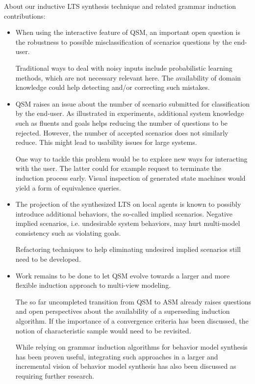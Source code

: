 About our inductive LTS synthesis technique and related grammar induction contributions:
\begin{itemize}

\item When using the interactive feature of QSM, an important open question is the robustness to possible misclassification of scenarios questions by the end-user. 

Traditional ways to deal with noisy inputs include probabilistic learning methods, which are not necessary relevant here. The availability of domain knowledge could help detecting and/or correcting such mistakes.

\item QSM raises an issue about the number of scenario submitted for classification by the end-user. As illustrated in experiments, additional system knowledge such as fluents and goals helps reducing the number of questions to be rejected. However, the number of accepted scenarios does not similarly reduce. This might lead to usability issues for large systems.

One way to tackle this problem would be to explore new ways for interacting with the user. The latter could for example request to terminate the induction process early. Visual inspection of generated state machines would yield a form of equivalence queries. 

\item The projection of the synthesized LTS on local agents is known to possibly introduce additional behaviors, the so-called implied scenarios. Negative implied scenarios, i.e. undesirable system behaviors, may hurt multi-model consistency such as violating goals. 

Refactoring techniques to help eliminating undesired implied scenarios still need to be developed.

\item Work remains to be done to let QSM evolve towards a larger and more flexible induction approach to multi-view modeling.

The so far uncompleted transition from QSM to ASM already raises questions and open perspectives about the availability of a superseding induction algorithm. If the importance of a convergence criteria has been discussed, the notion of characteristic sample would need to be revisited.

While relying on grammar induction algorithms for behavior model synthesis has been proven useful, integrating such approaches in a larger and incremental vision of behavior model synthesis has also been discussed as requiring further research.

\end{itemize}
